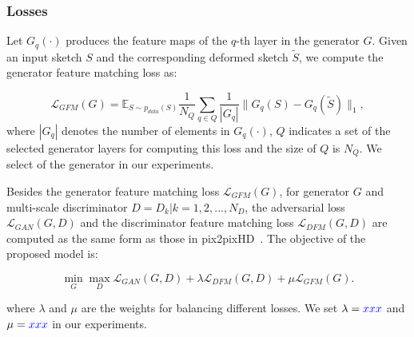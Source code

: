 
\subsubsection{Losses}
\label{subsec:algorithm_loss}



Let $G_q(\cdot)$ produces the feature maps of the $q$-th layer in the generator $G$.
%
Given an input sketch $S$ and the corresponding deformed sketch $\tilde{S}$, we compute the generator feature matching loss as:

\begin{equation}
	\label{eqn:loss_GFM}
	\mathcal{L}_{GFM}(G)=\mathbb{E}_{S\sim p_{data}(S)} \frac{1}{N_Q} \sum_{q\in Q}  \frac{1}{|G_q|} \|G_q(S)-G_q(\tilde{S}) \|_1,
\end{equation}
%
where $|G_q|$ denotes the number of elements in $G_q(\cdot)$, $Q$ indicates a set of the selected generator layers for computing this loss and the size of $Q$ is $N_Q$. 
We select  of the generator in our experiments.

Besides the generator feature matching loss $\mathcal{L}_{GFM}(G)$, for generator $G$ and multi-scale discriminator $D={D_k | k=1,2,...,N_D}$, the adversarial loss $\mathcal{L}_{GAN}(G, D)$ and the discriminator feature matching loss $\mathcal{L}_{DFM}(G, D)$ are computed as the same form as those in pix2pixHD~\cite{pix2pixHD}. 
%
The objective of the proposed model is:

\begin{equation}
	\label{eqn:new_minmax_game}
	\min_G \max_{D} \mathcal{L}_{GAN}(G, D)+\lambda \mathcal{L}_{DFM}(G, D) +\mu \mathcal{L}_{GFM}(G).
\end{equation}

where $\lambda$ and $\mu$ are the weights for balancing different losses. We set $\lambda=\textcolor{blue}{xxx}$ and $\mu=\textcolor{blue}{xxx}$ in our experiments.